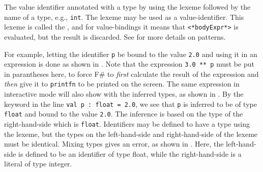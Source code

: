 \documentclass[fsharpNotes.tex]{subfiles}
\begin{document}
The value identifier annotated with a type by using the \idx[:@\lstinline{:}]{\lexeme{:}} lexeme followed by the name of a type, e.g., \lstinline{int}. The \idx[\_@\lstinline{_}]{\lexeme{\_}} lexeme may be used as a value-identifier. This lexeme is called the , and for value-bindings it means that \lstinline[language=syntax]{<*bodyExpr*>} is evaluated, but the result is discarded. See  for more details on patterns.

For example, letting the identifier \lstinline!p! be bound to the value \lstinline!2.0! and using it in an expression is done as shown in .
%
%
Note that the expression \lstinline{3.0 ** p} must be put in parantheses here, to force F\# to \emph{first} calculate the result of the expression and \emph{then} give it to \lstinline{printfn} to be printed on the screen. The same expression in interactive mode will also show with the inferred types, as shown in .
%
%
By the  keyword in the line \lstinline!val p : float = 2.0!, we see that \lstinline!p! is inferred to be of type \lstinline!float! and bound to the value \lstinline!2.0!. The inference is based on the type of the right-hand-side which is \lstinline!float!.  Identifiers may be defined to have a type using the \lexeme{:} lexeme, but the types on the left-hand-side and right-hand-side of the \lexeme{=} lexeme must be identical. Mixing types gives an error, as shown in .
%
%
%
Here, the left-hand-side is defined to be an identifier of type float, while the right-hand-side is a literal of type integer.

\end{document}
